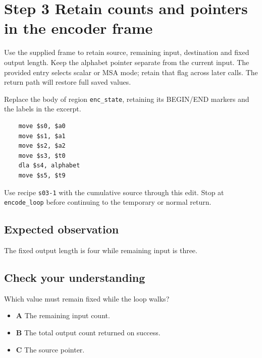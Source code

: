 \section{Step 3 Retain counts and pointers in the encoder frame}\label{base64-s03}

Use the supplied frame to retain source, remaining input, destination and fixed output length. Keep the alphabet pointer separate from the current input. The provided entry selects scalar or MSA mode; retain that flag across later calls. The return path will restore full saved values.

Replace the body of region \texttt{enc\_state}, retaining its BEGIN/END markers and the labels in the excerpt.

\begin{verbatim}
    move $s0, $a0
    move $s1, $a1
    move $s2, $a2
    move $s3, $t0
    dla $s4, alphabet
    move $s5, $t9
\end{verbatim}

Use recipe \texttt{s03-1} with the cumulative source through this edit. Stop at \texttt{encode\_loop} before continuing to the temporary or normal return.

\subsection{Expected observation}
The fixed output length is four while remaining input is three.

\subsection{Check your understanding}
Which value must remain fixed while the loop walks?

\begin{itemize}
  \item \textbf{A} The remaining input count.
  \item \textbf{B} The total output count returned on success.
  \item \textbf{C} The source pointer.
\end{itemize}
